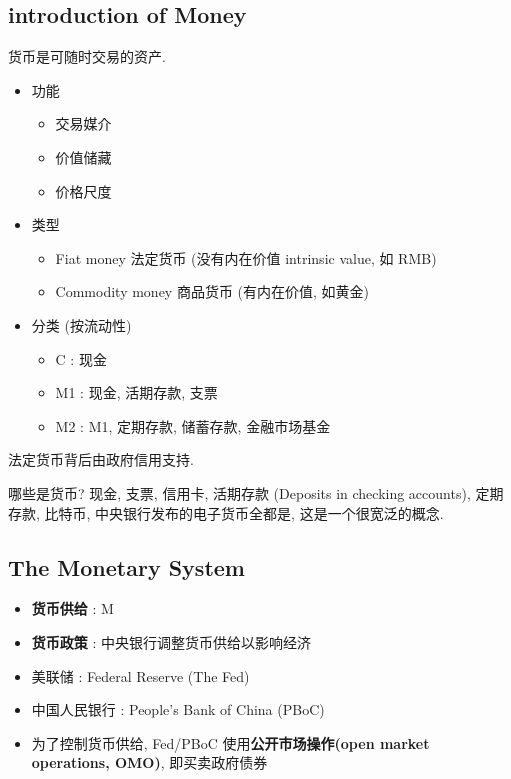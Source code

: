 \subsection{introduction of Money}
货币是可随时交易的资产.
\begin{proposition}
    \begin{itemize}
        \item 功能
        \begin{itemize}
            \item 交易媒介
            \item 价值储藏
            \item 价格尺度
        \end{itemize}
        \item 类型
        \begin{itemize}
            \item Fiat money 法定货币 (没有内在价值 intrinsic value, 如 RMB)
            \item Commodity money 商品货币 (有内在价值, 如黄金)
        \end{itemize}
        \item 分类 (按流动性)
        \begin{itemize}
            \item C : 现金
            \item M1 : 现金, 活期存款, 支票
            \item M2 : M1, 定期存款, 储蓄存款, 金融市场基金
        \end{itemize}
    \end{itemize}
\end{proposition}
\begin{note}法定货币背后由政府信用支持.\end{note}
\begin{problem}
    哪些是货币? 现金, 支票, 信用卡, 活期存款 (Deposits in checking accounts), 定期存款, 比特币, 中央银行发布的电子货币全都是, 这是一个很宽泛的概念.
\end{problem}

\subsection{The Monetary System}
\begin{definition}
    \begin{itemize}
        \item \textbf{货币供给} : M
        \item \textbf{货币政策} : 中央银行调整货币供给以影响经济
        \item 美联储 : Federal Reserve (The Fed)
        \item 中国人民银行 : People's Bank of China (PBoC)
        \item 为了控制货币供给, Fed/PBoC 使用\textbf{公开市场操作(open market operations, OMO)}, 即买卖政府债券
    \end{itemize}
\end{definition}

